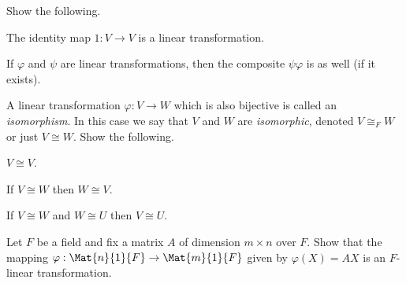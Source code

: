 \begin{exercises}
\ResumeExercises
\item Show the following.
\begin{enumerate*}
\item The identity map $1 : V \rightarrow V$ is a linear transformation.
\item If $\varphi$ and $\psi$ are linear transformations, then the composite $\psi\varphi$ is as well (if it exists).
\end{enumerate*}

\item A linear transformation $\varphi : V \rightarrow W$ which is also bijective is called an \emph{isomorphism}. In this case we say that $V$ and $W$ are \emph{isomorphic}, denoted $V \cong_F W$ or just $V \cong W$. Show the following.
\begin{enumerate*}
\item $V \cong V$.
\item If $V \cong W$ then $W \cong V$.
\item If $V \cong W$ and $W \cong U$ then $V \cong U$.
\end{enumerate*}

\item Let $F$ be a field and fix a matrix $A$ of dimension $m \times n$ over $F$. Show that the mapping $\varphi : \Mat{n}{1}{F} \rightarrow \Mat{m}{1}{F}$ given by $\varphi(X) = AX$ is an $F$-linear transformation.
\end{exercises}